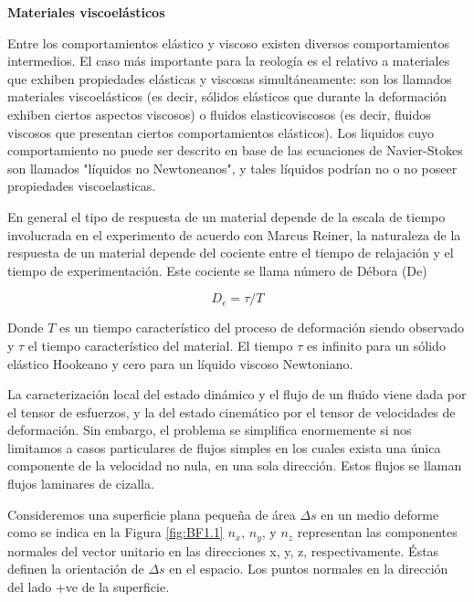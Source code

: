 \documentclass[review]{elsarticle}
\begin{document}
\textbf{Materiales viscoel\'asticos}

Entre los comportamientos el\'astico y viscoso existen diversos comportamientos intermedios. El caso m\'as importante para la reolog\'ia
es el relativo a materiales que exhiben propiedades el\'asticas y viscosas simult\'aneamente: son los llamados materiales viscoel\'asticos (es
decir, s\'olidos el\'asticos que durante la deformaci\'on exhiben ciertos aspectos viscosos) o fluidos elasticoviscosos (es decir, fluidos viscosos
que presentan ciertos comportamientos el\'asticos). Los liquidos cuyo comportamiento no puede ser descrito en base de las ecuaciones de Navier-Stokes
son llamados "l\'iquidos no Newtoneanos", y tales l\'iquidos podr\'ian no o no poseer propiedades viscoelasticas\cite{Barnes1989}.

En general el tipo de respuesta de un material depende de la escala de tiempo involucrada en el experimento de acuerdo con Marcus
Reiner, la naturaleza de la respuesta de un material depende del cociente entre el tiempo de relajaci\'on y el tiempo de experimentaci\'on. Este cociente
se llama n\'umero de D\'ebora (De)

\begin{equation}D_{e} =\tau /T \label{BE1.3}
\end{equation}

Donde $T$ es un tiempo caracter\'istico del proceso de deformaci\'on siendo observado y $\tau $ el tiempo caracter\'istico del material. El tiempo $\tau $ es infinito para un s\'olido el\'astico Hookeano y cero para un l\'iquido viscoso Newtoniano.

La caracterizaci\'on local del estado din\'amico y el flujo de un fluido viene dada por el tensor de esfuerzos, y la del estado cinem\'atico
por el tensor de velocidades de deformaci\'on. Sin embargo, el problema se simplifica enormemente si nos limitamos a casos particulares de flujos simples
en los cuales exista una \'unica componente de la velocidad no nula, en una sola direcci\'on. Estos flujos se llaman flujos laminares de cizalla\cite{1560815795}.

Consideremos una superficie plana peque{\~n}a de \'area $ \Delta s$ en un medio deforme como se indica en la Figura \ref{fig:BF1.1} $n_{x}$, $n_{y}$, y $n_{z}$ representan las componentes normales del vector unitario en las direcciones x, y, z, respectivamente. \'Estas definen la orientaci\'on
de $ \Delta s$ en el espacio. Los puntos normales en la direcci\'on del lado +ve de la superficie.
\end{document}
